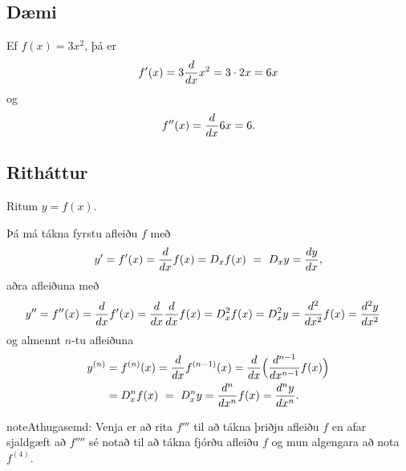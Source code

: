 \documentclass[a4paper,10pt,icelandic]{sphinxmanual}
\begin{document}
\subsection{Dæmi}
\label{kafli03:id8}
Ef \(f(x)  = 3x^2\), þá er
\begin{gather}
\begin{split}f'(x) = 3\frac{d}{dx}x^2 = 3\cdot 2x = 6x\end{split}\notag
\end{gather}
og
\begin{gather}
\begin{split}f''(x) = \frac{d}{dx} 6x = 6.\end{split}\notag
\end{gather}

\subsection{Ritháttur}
\label{kafli03:id9}
Ritum \(y=f(x)\).

Þá má tákna fyrstu afleiðu \(f\) með
\begin{gather}
\begin{split}y'= f'(x)=\frac{d}{dx}f(x)=D_xf(x)\ =\ D_x y= \frac{dy}{dx},\end{split}\notag
\end{gather}
aðra afleiðuna með
\begin{gather}
\begin{split}\begin{aligned}
y'' &=
f''(x)=\frac{d}{dx}f'(x)=\frac{d}{dx}\frac{d}{dx}f(x)
= D^2_xf(x)= D^2_x y=\frac{d^2}{dx^2}f(x)=\frac{d^2 y}{dx^2}\end{aligned}\end{split}\notag
\end{gather}
og almennt \(n\)-tu afleiðuna
\begin{gather}
\begin{split}\begin{aligned}
y^{(n)} &= f^{(n)}(x)=\frac{d}{dx}f^{(n-1)}(x)=
\frac{d}{dx}\Big(\frac{d^{n-1}}{dx^{n-1}}f(x)\Big) \\
&=D^n_xf(x)\ =\ D^n_x y
=\frac{d^n}{dx^n}f(x)
= \frac{d^n y}{dx^n}.\end{aligned}\end{split}\notag
\end{gather}
\begin{notice}{note}{Athugasemd:}
Venja er að rita \(f'''\) til að tákna þriðju afleiðu \(f\) en
afar sjaldgæft að \(f''''\) sé notað til að tákna fjórðu afleiðu
\(f\) og mun algengara að nota \(f^{(4)}\).
\end{notice}
\end{document}
